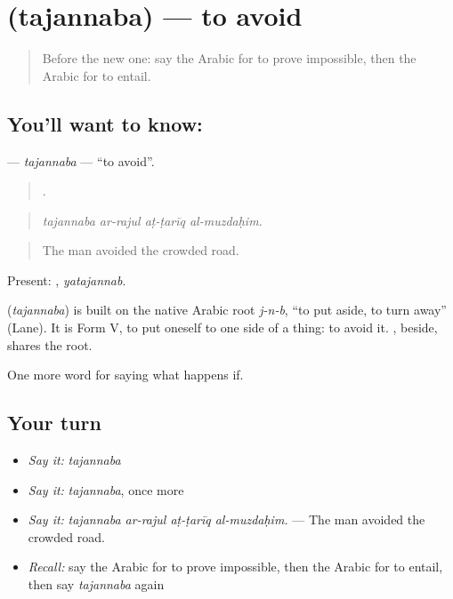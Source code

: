 \section[\texorpdfstring{\ar{تجنب} (tajannaba)}{تجنب (tajannaba)}]{ (tajannaba) — to avoid}

\label{lesson:AR-C407-tajannaba}



\begin{quote}
Before the new one: say the Arabic for to prove impossible, then the Arabic for to entail.
\end{quote}

\subsection*{You'll want to know: }
\textbf{} — \emph{tajannaba} — \textquotedblleft{}to avoid\textquotedblright{}.

\begin{quote}
   .
\end{quote}

\begin{quote}
\emph{tajannaba ar-rajul aṭ-ṭarīq al-muzdaḥim.}
\end{quote}

\begin{quote}
The man avoided the crowded road.
\end{quote}

Present: , \emph{yatajannab}.

\begin{cousinweb}
\textbf{} (\emph{tajannaba}) is built on the native Arabic root \emph{j-n-b}, \textquotedblleft{}to put aside, to turn away\textquotedblright{} (Lane). It is Form V, to put oneself to one side of a thing: to avoid it. , beside, shares the root.
\end{cousinweb}

\begin{grammarlens}[title={What you've built}]
One more word for saying what happens if.
\end{grammarlens}

\subsection*{Your turn}
\begin{itemize}
\raggedright
  \item \emph{Say it:} \emph{tajannaba}
  \item \emph{Say it:} \emph{tajannaba}, once more
  \item \emph{Say it:} \emph{tajannaba ar-rajul aṭ-ṭarīq al-muzdaḥim.} — The man avoided the crowded road.
  \item \emph{Recall:} say the Arabic for to prove impossible, then the Arabic for to entail, then say \emph{tajannaba} again
\end{itemize}

